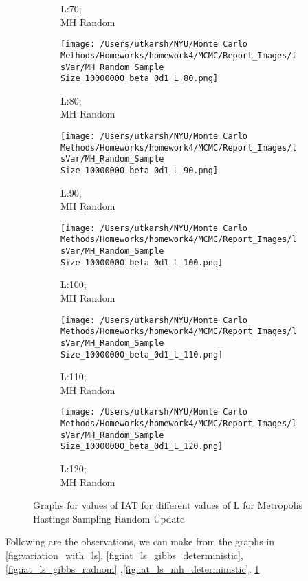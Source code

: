 \documentclass[11pt]{article}
\begin{document}
\begin{figure}[H]
\begin{subfigure}{.20\textwidth}
		\caption{L:70;\\MH Random}
	\end{subfigure}
	\begin{subfigure}{.20\textwidth}
		\texttt{[image: /Users/utkarsh/NYU/Monte Carlo Methods/Homeworks/homework4/MCMC/Report\_Images/lsVar/MH\_Random\_Sample Size\_10000000\_beta\_0d1\_L\_80.png]}
		\caption{L:80;\\MH Random}
	\end{subfigure}
	\begin{subfigure}{.20\textwidth}
		\texttt{[image: /Users/utkarsh/NYU/Monte Carlo Methods/Homeworks/homework4/MCMC/Report\_Images/lsVar/MH\_Random\_Sample Size\_10000000\_beta\_0d1\_L\_90.png]}
		\caption{L:90;\\MH Random}
	\end{subfigure}
	\begin{subfigure}{.20\textwidth}
		\texttt{[image: /Users/utkarsh/NYU/Monte Carlo Methods/Homeworks/homework4/MCMC/Report\_Images/lsVar/MH\_Random\_Sample Size\_10000000\_beta\_0d1\_L\_100.png]}
		\caption{L:100;\\MH Random}
	\end{subfigure}
	\begin{subfigure}{.20\textwidth}
		\texttt{[image: /Users/utkarsh/NYU/Monte Carlo Methods/Homeworks/homework4/MCMC/Report\_Images/lsVar/MH\_Random\_Sample Size\_10000000\_beta\_0d1\_L\_110.png]}
		\caption{L:110;\\MH Random}
	\end{subfigure}
	\begin{subfigure}{.20\textwidth}
		\texttt{[image: /Users/utkarsh/NYU/Monte Carlo Methods/Homeworks/homework4/MCMC/Report\_Images/lsVar/MH\_Random\_Sample Size\_10000000\_beta\_0d1\_L\_120.png]}
		\caption{L:120;\\MH Random}
	\end{subfigure}
    \caption{Graphs for values of IAT for different values of L for Metropolis Hastings Sampling Random Update}
\label{fig:iat_ls_mh_radnom}
\end{figure}

Following are the observations, we can make from the graphs in 	\ref{fig:variation_with_ls}, \ref{fig:iat_ls_gibbs_deterministic}, \ref{fig:iat_ls_gibbs_radnom}
,\ref{fig:iat_ls_mh_deterministic}, \ref{fig:iat_ls_mh_radnom}
\end{document}
